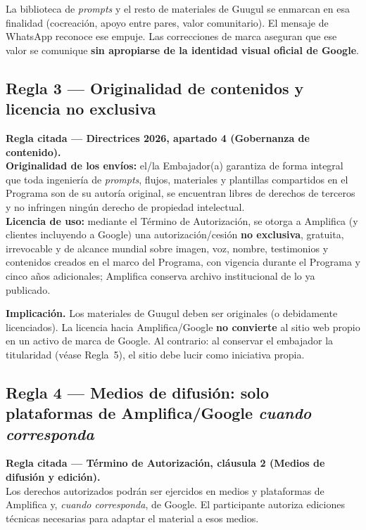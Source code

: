 \documentclass[11pt,a4paper]{article}
\newcommand{\regla}[2]{%
  \begin{reglabox}
  \noindent\textbf{Regla citada --- #1.}\\[0.35em]
  \small #2
  \end{reglabox}
}
\begin{document}
La biblioteca de \emph{prompts} y el resto de materiales de Guugul se enmarcan en esa finalidad (cocreación, apoyo entre pares, valor comunitario). El mensaje de WhatsApp reconoce ese empuje. Las correcciones de marca aseguran que ese valor se comunique \textbf{sin apropiarse de la identidad visual oficial de Google}.

\subsection{Regla 3 --- Originalidad de contenidos y licencia no exclusiva}

\regla{Directrices 2026, apartado 4 (Gobernanza de contenido)}{%
\textbf{Originalidad de los envíos:} el/la Embajador(a) garantiza de forma integral que toda ingeniería de \emph{prompts}, flujos, materiales y plantillas compartidos en el Programa son de su autoría original, se encuentran libres de derechos de terceros y no infringen ningún derecho de propiedad intelectual.\\[0.4em]
\textbf{Licencia de uso:} mediante el Término de Autorización, se otorga a Amplifica (y clientes incluyendo a Google) una autorización/cesión \textbf{no exclusiva}, gratuita, irrevocable y de alcance mundial sobre imagen, voz, nombre, testimonios y contenidos creados en el marco del Programa, con vigencia durante el Programa y cinco años adicionales; Amplifica conserva archivo institucional de lo ya publicado.}

\begin{cumplbox}
\noindent\textbf{Implicación.} Los materiales de Guugul deben ser originales (o debidamente licenciados). La licencia hacia Amplifica/Google \textbf{no convierte} al sitio web propio en un activo de marca de Google. Al contrario: al conservar el embajador la titularidad (véase Regla~5), el sitio debe lucir como iniciativa propia.
\end{cumplbox}

\subsection{Regla 4 --- Medios de difusión: solo plataformas de Amplifica/Google \emph{cuando corresponda}}

\regla{Término de Autorización, cláusula 2 (Medios de difusión y edición)}{%
Los derechos autorizados podrán ser ejercidos en medios y plataformas de Amplifica y, \emph{cuando corresponda}, de Google. El participante autoriza ediciones técnicas necesarias para adaptar el material a esos medios.}
\end{document}
